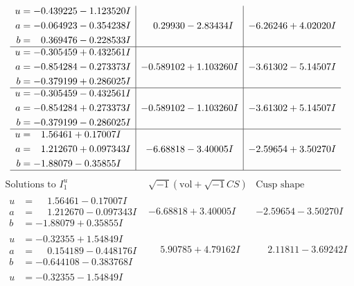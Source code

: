 \documentclass[1p]{elsarticle_modified}
\theoremstyle{definition}
\newcommand{\I}{\sqrt{-1}}
\begin{document}
$$\begin{array}{c|c|c}
\begin{aligned}
u &= -0.439225 - 1.123520 I \\
a &= -0.064923 - 0.354238 I \\
b &= \phantom{-}0.369476 - 0.228533 I\end{aligned}
 & \phantom{-}0.29930 - 2.83434 I & -6.26246 + 4.02020 I \\ \hline\begin{aligned}
u &= -0.305459 + 0.432561 I \\
a &= -0.854284 - 0.273373 I \\
b &= -0.379199 + 0.286025 I\end{aligned}
 & -0.589102 + 1.103260 I & -3.61302 - 5.14507 I \\ \hline\begin{aligned}
u &= -0.305459 - 0.432561 I \\
a &= -0.854284 + 0.273373 I \\
b &= -0.379199 - 0.286025 I\end{aligned}
 & -0.589102 - 1.103260 I & -3.61302 + 5.14507 I \\ \hline\begin{aligned}
u &= \phantom{-}1.56461 + 0.17007 I \\
a &= \phantom{-}1.212670 + 0.097343 I \\
b &= -1.88079 - 0.35855 I\end{aligned}
 & -6.68818 - 3.40005 I & -2.59654 + 3.50270 I\\
 \hline 
 \end{array}$$\newpage$$\begin{array}{c|c|c}  
\text{Solutions to }I^u_{1}& \I (\text{vol} + \sqrt{-1}CS) & \text{Cusp shape}\\
 \hline 
\begin{aligned}
u &= \phantom{-}1.56461 - 0.17007 I \\
a &= \phantom{-}1.212670 - 0.097343 I \\
b &= -1.88079 + 0.35855 I\end{aligned}
 & -6.68818 + 3.40005 I & -2.59654 - 3.50270 I \\ \hline\begin{aligned}
u &= -0.32355 + 1.54849 I \\
a &= \phantom{-}0.154189 - 0.448176 I \\
b &= -0.644108 - 0.383768 I\end{aligned}
 & \phantom{-}5.90785 + 4.79162 I & \phantom{-}2.11811 - 3.69242 I \\ \hline\begin{aligned}
u &= -0.32355 - 1.54849 I \\

\end{aligned}
\end{array}$$
\end{document}
